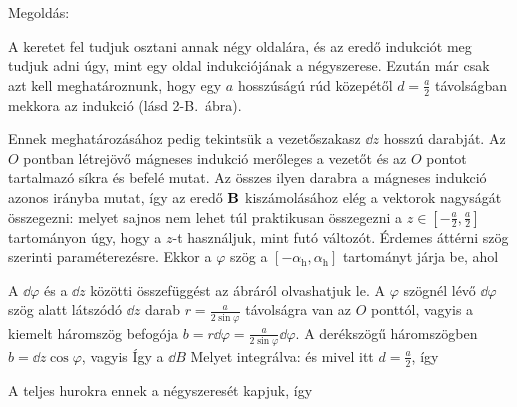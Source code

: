 
\ifdefined\megoldas
  
 Megoldás: 

 A keretet fel tudjuk osztani annak négy oldalára, és az eredő indukciót meg tudjuk adni úgy, mint egy oldal indukciójának a négyszerese. Ezután már csak azt kell meghatároznunk, hogy egy $a$ hosszúságú rúd közepétől $d=\frac{a}{2}$ távolságban mekkora az indukció (lásd 2-B.~ábra).

 Ennek meghatározásához pedig tekintsük a vezetőszakasz $\dd z$ hosszú darabját. Az $O$ pontban létrejövő mágneses indukció merőleges a vezetőt és az $O$ pontot tartalmazó síkra és befelé mutat. Az összes ilyen darabra a mágneses indukció azonos irányba mutat, így az eredő $\mathbf{B}$ kiszámolásához elég a vektorok nagyságát összegezni:
 melyet sajnos nem lehet túl praktikusan összegezni a $z\in\left[-\frac{a}{2},\frac{a}{2}\right]$ tartományon úgy, hogy a $z$-t használjuk, mint futó változót. Érdemes áttérni szög szerinti paraméterezésre. Ekkor a $\varphi$ szög a $[-\alpha_\text{h},\alpha_\text{h}]$ tartományt járja be, ahol
 

 A $\dd\varphi$ és a $\dd z$ közötti összefüggést az ábráról olvashatjuk le. A $\varphi$ szögnél lévő $\dd\varphi$ szög alatt látszódó $\dd z$ darab $r=\frac{a}{2\sin\varphi}$ távolságra van az $O$ ponttól, vagyis a kiemelt háromszög befogója $b=r\dd\varphi=\frac{a}{2\sin\varphi}\dd\varphi$. A derékszögű háromszögben $b=\dd z\cos\varphi$, vagyis
 Így a $\dd B$
 Melyet integrálva:
 és mivel itt $d=\frac{a}{2}$, így

 A teljes hurokra ennek a négyszeresét kapjuk, így

\fi